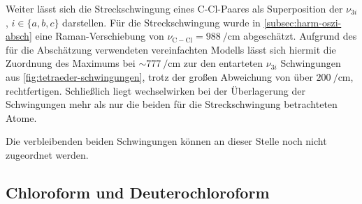 \documentclass[../bericht.tex]{subfiles}
\begin{document}
        Weiter lässt sich die Streckschwingung eines C-Cl-Paares als Superposition der $\nu_{3i}$, $i\in\{ a,b,c\}$ darstellen. Für die Streckschwingung wurde in \cref{subsec:harm-oszi-absch} eine Raman-Verschiebung von $\nu_\mathrm{C-Cl}=\SI{988}{\per\centi\meter}$ abgeschätzt. Aufgrund des für die Abschätzung verwendeten vereinfachten Modells lässt sich hiermit die Zuordnung des Maximums bei $\sim \SI{777}{\per\centi\meter}$ zur den entarteten $\nu_{3i}$ Schwingungen aus \cref{fig:tetraeder-schwingungen}, trotz der großen Abweichung von über $\SI{200}{\per\centi\meter}$, rechtfertigen. Schließlich liegt wechselwirken bei der Überlagerung der Schwingungen mehr als nur die beiden für die Streckschwingung betrachteten Atome.
        \medskip

        Die verbleibenden beiden Schwingungen können an dieser Stelle noch nicht zugeordnet werden.


      \subsection{Chloroform und Deuterochloroform}
      \label{subsec:chloro-deutero}
\end{document}
